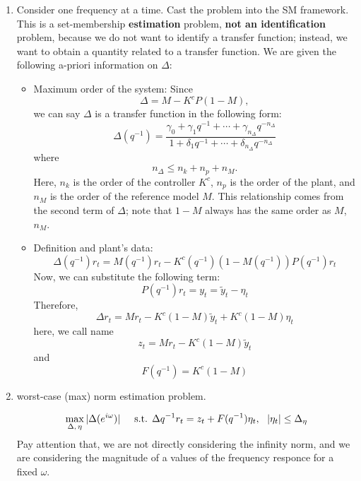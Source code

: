 \begin{enumerate}
\item Consider one frequency at a time. Cast the problem into the SM framework. This is a set-membership \textbf{estimation} problem, \textbf{not an identification} problem, because we do not want to identify a transfer function; instead, we want to obtain a quantity related to a transfer function. We are given the following a-priori information on \(\Delta\):

\begin{itemize}
    \item Maximum order of the system: Since 
    \[
    \Delta = M - K^cP(1-M),
    \]
    we can say \(\Delta\) is a transfer function in the following form:
    \[
    \Delta(q^{-1}) = \frac{\gamma_0 + \gamma_1 q^{-1} + \cdots + \gamma_{n_\Delta}q^{-n_{\Delta}}}{1 + \delta_1 q^{-1} + \cdots + \delta_{n_\Delta}q^{-n_{\Delta}}}
    \]
    where
    \[
    n_\Delta \leq n_k + n_p + n_M.
    \]
    Here, \(n_k\) is the order of the controller \(K^c\), \(n_p\) is the order of the plant, and \(n_M\) is the order of the reference model \(M\). This relationship comes from the second term of \(\Delta\); note that \(1-M\) always has the same order as \(M\), \(n_M\).

    \item Definition and plant's data:
    \[
    \Delta(q^{-1})r_t = M(q^{-1})r_t - K^c(q^{-1})(1-M(q^{-1}))P(q^{-1})r_t 
    \]
    Now, we can substitute the following term:
    \[
    P(q^{-1})r_t = y_t = \tilde{y}_t - \eta_t
    \]
    Therefore,
    \[
    \Delta r_t = Mr_t - K^c(1-M)\tilde{y}_t + K^c (1-M)\eta_t
    \]
    here, we call name
    \[
    z_t = Mr_t - K^c(1-M)\tilde{y}_t
    \]
    and
    \[
    F(q^{-1}) = K^c (1-M)
    \]
    
    
\end{itemize}
    \item worst-case (max) norm estimation problem.
    
        \[
        \max_{\Delta,\,\eta} |\Delta(e^{i\omega})| \hspace{0.5cm} \text{s.t. } \Delta{q^{-1}}r_t = z_t + F(q^{-1})\eta_t,\,\,\,\,|\eta_t|\leq \Delta_\eta
        \]
        Pay attention that, we are not directly considering the infinity norm, and we are considering the magnitude of a values of the frequency responce for a fixed $\omega$.
        

\end{enumerate}
